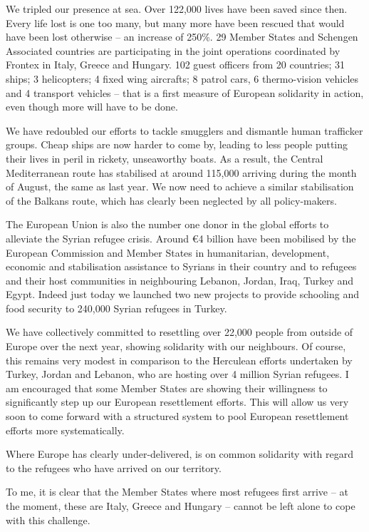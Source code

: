 \documentclass[a4paper,11pt]{article}
\begin{document}
We tripled our presence at sea. Over 122,000 lives have been saved since then. Every life lost is one too many, but many more have been rescued that would have been lost otherwise – an increase of 250\%. 29 Member States and Schengen Associated countries are participating in the joint operations coordinated by Frontex in Italy, Greece and Hungary. 102 guest officers from 20 countries; 31 ships; 3 helicopters; 4 fixed wing aircrafts; 8 patrol cars, 6 thermo-vision vehicles and 4 transport vehicles – that is a first measure of European solidarity in action, even though more will have to be done.

We have redoubled our efforts to tackle smugglers and dismantle human trafficker groups. Cheap ships are now harder to come by, leading to less people putting their lives in peril in rickety, unseaworthy boats. As a result, the Central Mediterranean route has stabilised at around 115,000 arriving during the month of August, the same as last year. We now need to achieve a similar stabilisation of the Balkans route, which has clearly been neglected by all policy-makers.

The European Union is also the number one donor in the global efforts to alleviate the Syrian refugee crisis. Around \euro4 billion have been mobilised by the European Commission and Member States in humanitarian, development, economic and stabilisation assistance to Syrians in their country and to refugees and their host communities in neighbouring Lebanon, Jordan, Iraq, Turkey and Egypt. Indeed just today we launched two new projects to provide schooling and food security to 240,000 Syrian refugees in Turkey.

We have collectively committed to resettling over 22,000 people from outside of Europe over the next year, showing solidarity with our neighbours. Of course, this remains very modest in comparison to the Herculean efforts undertaken by Turkey, Jordan and Lebanon, who are hosting over 4 million Syrian refugees. I am encouraged that some Member States are showing their willingness to significantly step up our European resettlement efforts. This will allow us very soon to come forward with a structured system to pool European resettlement efforts more systematically.

Where Europe has clearly under-delivered, is on common solidarity with regard to the refugees who have arrived on our territory.

To me, it is clear that the Member States where most refugees first arrive – at the moment, these are Italy, Greece and Hungary – cannot be left alone to cope with this challenge.
\end{document}
